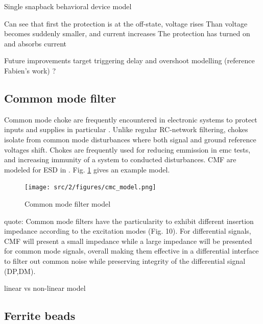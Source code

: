 \begin{code}
\inputminted[frame=single,breaklines=true]{VHDL}{src/2/snippets/beh_snapback.vhd}
\label{lst:snapback-device}
\caption{Single snapback behavioral device model}
\end{code}

Can see that first the protection is at the off-state, voltage rises
Than voltage becomes suddenly smaller, and current increases
The protection has turned on and absorbs current

Future improvements target triggering delay and overshoot modelling (reference Fabien's work) ?

\subsection{Common mode filter}

Common mode choke are frequently encountered in electronic systems to protect inputs and supplies in particular \cite{cmc-for-emc-protection, cmc-esd, alternative-cmc-emi-noise}.
Unlike regular RC-network filtering, chokes isolate from common mode disturbances where both signal and ground reference voltages shift.
Chokes are frequently used for reducing emmission in \gls{emc} tests, and increasing immunity of a system to conducted disturbances.
CMF are modeled for ESD in \cite{usb2ESDProtection}.
Fig. \ref{fig:cmf-model} gives an example model.

\begin{figure}[!h]
  \centering
  \texttt{[image: src/2/figures/cmc\_model.png]}
  \caption{Common mode filter model}
  \label{fig:cmf-model}
\end{figure}

quote:
Common mode filters have the particularity to exhibit
different insertion impedance according to the
excitation modes (Fig. 10). For differential signals,
CMF will present a small impedance while a large
impedance will be presented for common mode
signals, overall making them effective in a
differential interface to filter out common noise while
preserving integrity of the differential signal
(DP,DM).

linear vs non-linear model

\subsection{Ferrite beads}

